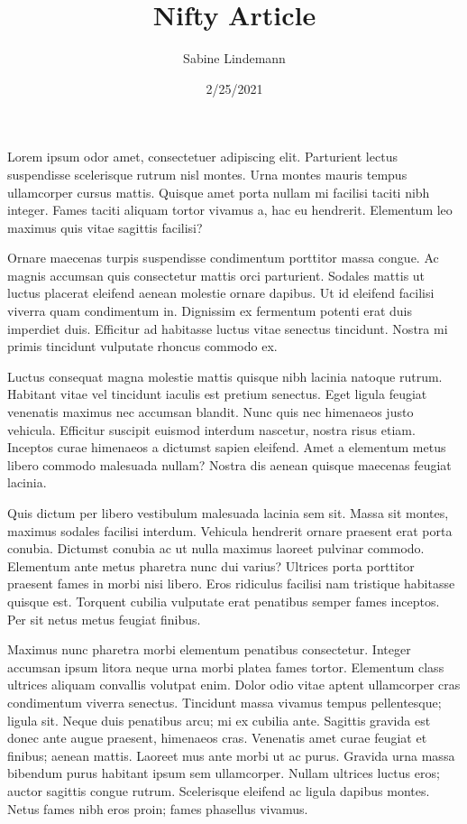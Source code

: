 \documentclass[a4paper]{article}
\title{Nifty Article}
\author{Sabine Lindemann}
\date{2/25/2021}
\begin{document}
\maketitle
Lorem ipsum odor amet, consectetuer adipiscing elit. Parturient lectus suspendisse scelerisque rutrum nisl montes. Urna montes mauris tempus ullamcorper cursus mattis. Quisque amet porta nullam mi facilisi taciti nibh integer. Fames taciti aliquam tortor vivamus a, hac eu hendrerit. Elementum leo maximus quis vitae sagittis facilisi?



Ornare maecenas turpis suspendisse condimentum porttitor massa congue. Ac magnis accumsan quis consectetur mattis orci parturient. Sodales mattis ut luctus placerat eleifend aenean molestie ornare dapibus. Ut id eleifend facilisi viverra quam condimentum in. Dignissim ex fermentum potenti erat duis imperdiet duis. Efficitur ad habitasse luctus vitae senectus tincidunt. Nostra mi primis tincidunt vulputate rhoncus commodo ex.

                                   Luctus consequat magna molestie mattis quisque nibh lacinia natoque rutrum. Habitant vitae vel tincidunt iaculis est pretium senectus. Eget ligula feugiat venenatis maximus nec accumsan blandit. Nunc quis nec himenaeos justo vehicula. Efficitur suscipit euismod interdum nascetur, nostra risus etiam. Inceptos curae himenaeos a dictumst sapien eleifend. Amet a elementum metus libero commodo malesuada nullam? Nostra dis aenean quisque maecenas feugiat lacinia.

Quis dictum per libero vestibulum malesuada lacinia sem sit. Massa sit montes, maximus sodales          facilisi interdum. Vehicula hendrerit ornare praesent erat porta conubia. Dictumst conubia ac ut nulla maximus laoreet pulvinar commodo. Elementum ante metus pharetra nunc dui varius?                     Ultrices porta porttitor praesent fames in morbi nisi libero. Eros ridiculus facilisi nam tristique habitasse quisque est. Torquent                  cubilia vulputate erat penatibus semper fames inceptos. Per sit netus metus feugiat finibus.

Maximus nunc pharetra morbi elementum penatibus consectetur. Integer accumsan ipsum litora neque urna morbi platea fames tortor. Elementum class ultrices aliquam convallis volutpat enim. Dolor odio vitae aptent ullamcorper cras condimentum viverra senectus. Tincidunt massa vivamus tempus pellentesque; ligula sit. Neque duis penatibus arcu; mi ex cubilia ante. Sagittis gravida est donec ante augue praesent, himenaeos cras. Venenatis amet curae feugiat et finibus; aenean mattis. Laoreet mus ante morbi ut ac purus. Gravida urna massa bibendum purus habitant ipsum sem ullamcorper. Nullam ultrices luctus eros; auctor sagittis congue rutrum. Scelerisque eleifend ac ligula dapibus montes. Netus fames nibh eros proin; fames phasellus vivamus.
\end{document}
